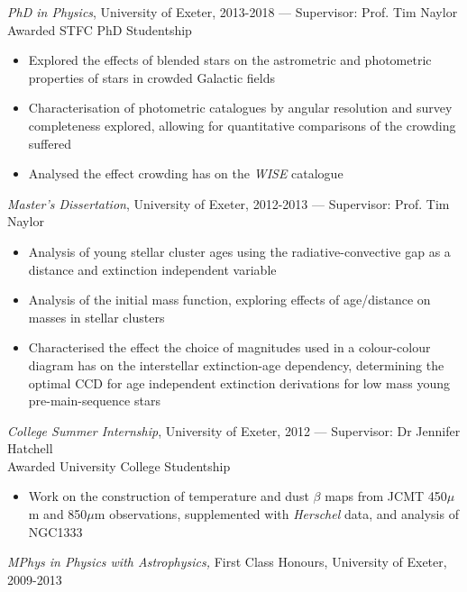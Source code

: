 \documentclass[letter, margin, 10pt]{res} %
\begin{document}
\begin{resume}
{\sl PhD in Physics}, University of Exeter, 2013-2018 --- Supervisor: Prof. Tim Naylor\\
\null\quad\quad Awarded STFC PhD Studentship
\begin{itemize}[noitemsep,topsep=0pt,parsep=0pt,partopsep=0pt]
\item Explored the effects of blended stars on the astrometric and photometric properties of stars in crowded Galactic fields
\item Characterisation of photometric catalogues by angular resolution and survey completeness explored, allowing for quantitative comparisons of the crowding suffered
\item Analysed the effect crowding has on the \textit{WISE} catalogue
\end{itemize}
\vspace{-10pt}
{\sl Master's Dissertation}, University of Exeter, 2012-2013 --- Supervisor: Prof. Tim Naylor
\begin{itemize}[noitemsep,topsep=0pt,parsep=0pt,partopsep=0pt]
\item Analysis of young stellar cluster ages using the radiative-convective gap as a distance and extinction independent variable
\item Analysis of the initial mass function, exploring effects of age/distance on masses in stellar clusters
\item Characterised the effect the choice of magnitudes used in a colour-colour diagram has on the interstellar extinction-age dependency, determining the optimal CCD for age independent extinction derivations for low mass young pre-main-sequence stars
\end{itemize}
\vspace{-10pt}
{\sl College Summer Internship}, University of Exeter, 2012 --- Supervisor: Dr Jennifer Hatchell\\
\null\quad\quad Awarded University College Studentship
\begin{itemize}[noitemsep,topsep=0pt,parsep=0pt,partopsep=0pt]
\item Work on the construction of temperature and dust $\beta$ maps from JCMT 450$\mu$m and 850$\mu$m observations, supplemented with \textit{Herschel} data, and analysis of NGC1333
\end{itemize}
\vspace{-10pt}
{\sl MPhys in Physics with Astrophysics,} First Class Honours, University of Exeter, 2009-2013

\vspace{-6pt}

\end{resume}
\end{document}
